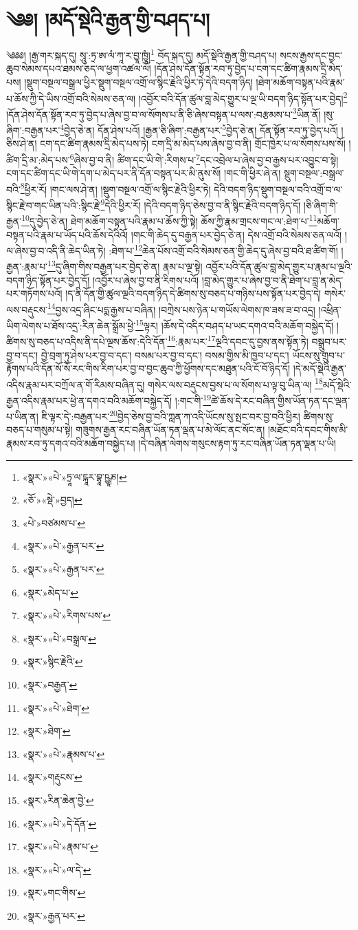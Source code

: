 \chapter{༄༅། །མདོ་སྡེའི་རྒྱན་གྱི་བཤད་པ།}༄༅༅། །རྒྱ་གར་སྐད་དུ། སཱུ་:ཏྲ་ཨ་ལཾ་ཀཱ་ར་བྱཱ་ཁྱཱཾ།\footnote{«སྣར་»«པེ་»ཏྲཱ་ལ་ངྐཱར་བྷཱ་ཥྱཱཎ།} བོད་སྐད་དུ། མདོ་སྡེའི་རྒྱན་གྱི་བཤད་པ། སངས་རྒྱས་དང་བྱང་ཆུབ་སེམས་དཔའ་ཐམས་ཅད་ལ་ཕྱག་འཚལ་ལོ། །དོན་ཤེས་དོན་སྟོན་རབ་ཏུ་བྱེད་པ་ངག་དང་ཚིག་རྣམས་དྲི་མེད་པས། །སྡུག་བསྔལ་བསྒྲལ་ཕྱིར་སྡུག་བསྔལ་འགྲོ་ལ་སྙིང་རྗེའི་ཕྱིར་ཏེ་དེའི་བདག་ཉིད། །ཐེག་མཆོག་བསྟན་པའི་རྣམ་པ་ཆོས་ཀྱི་དེ་ཡིས་འགྲོ་བའི་སེམས་ཅན་ལ། །འབྱོར་བའི་དོན་ཚུལ་བླ་མེད་གྱུར་པ་ལྔ་ཡི་བདག་ཉིད་སྟོན་པར་བྱེད།\footnote{«ཅོ་»«སྡེ་»བྱད།} །དོན་ཤེས་དོན་སྟོན་རབ་ཏུ་བྱེད་པ་ཞེས་བྱ་བ་ལ་སོགས་པ་ནི་ཅི་ཞེས་བསྟན་པ་ལས་:བརྩམས་པ་\footnote{«པེ་»བཙམས་པ་}ཡིན་ནོ། །སུ་ཞིག་:བརྒྱན་པར་\footnote{«སྣར་»«པེ་»རྒྱན་པར་}བྱེད་ཅེ་ན། དོན་ཤེས་པའོ། །རྒྱན་ཅི་ཞིག་:བརྒྱན་པར་\footnote{«སྣར་»«པེ་»རྒྱན་པར་}བྱེད་ཅེ་ན། དོན་སྟོན་རབ་ཏུ་བྱེད་པའོ། །ཅིས་ཤེ་ན། ངག་དང་ཚིག་རྣམས་དྲི་མེད་པས་ཏེ། ངག་དྲི་མ་མེད་པས་ཞེས་བྱ་བ་ནི། གྲོང་ཁྱེར་པ་ལ་སོགས་པས་སོ། །ཚིག་དྲི་མ་:མེད་པས་\footnote{«སྣར་»མེད་པ་}ཞེས་བྱ་བ་ནི། ཚིག་དང་ཡི་གེ་:རིགས་པ་\footnote{«སྣར་»«པེ་»རིགས་པས་}དང་འབྲེལ་པ་ཞེས་བྱ་བ་རྒྱས་པར་འབྱུང་བ་སྟེ། ངག་དང་ཚིག་དང་ཡི་གེ་དག་པ་མེད་པར་ནི་དོན་བསྟན་པར་མི་ནུས་སོ། །གང་གི་ཕྱིར་ཞེ་ན། སྡུག་བསྔལ་:བསྒྲལ་བའི་\footnote{«སྣར་»«པེ་»བསྒྲལ་}ཕྱིར་རོ། །གང་ལས་ཤེ་ན། །སྡུག་བསྔལ་འགྲོ་ལ་སྙིང་རྗེའི་ཕྱིར་ཏེ། དེའི་བདག་ཉིད་སྡུག་བསྔལ་བའི་འགྲོ་བ་ལ་སྙིང་རྗེ་བ་གང་ཡིན་པའི་:སྙིང་རྗེ་\footnote{«སྣར་»སྙིང་རྗེའི་}དེའི་ཕྱིར་རོ། །དེའི་བདག་ཉིད་ཅེས་བྱ་བ་ནི་སྙིང་རྗེའི་བདག་ཉིད་དོ། །ཅི་ཞིག་གི་རྒྱན་\footnote{«སྣར་»བརྒྱན་}དུ་བྱེད་ཅེ་ན། ཐེག་མཆོག་བསྟན་པའི་རྣམ་པ་ཆོས་ཀྱི་སྟེ། ཆོས་ཀྱི་རྣམ་གྲངས་གང་ལ་:ཐེག་པ་\footnote{«སྣར་»«པེ་»ཐེག་}མཆོག་བསྟན་པའི་རྣམ་པ་ཡོད་པའི་ཆོས་དེའིའོ། །གང་གི་ཆེད་དུ་བརྒྱན་པར་བྱེད་ཅེ་ན། དེས་འགྲོ་བའི་སེམས་ཅན་ལའོ། །ལ་ཞེས་བྱ་བ་འདི་ནི་ཆེད་ཡིན་ཏེ། :ཐེག་པ་\footnote{«སྣར་»ཐེག་}ཆེན་པོས་འགྲོ་བའི་སེམས་ཅན་གྱི་ཆེད་དུ་ཞེས་བྱ་བའི་ཐ་ཚིག་གོ། །རྒྱན་:རྣམ་པ་\footnote{«སྣར་»«པེ་»རྣམས་པ་}དུ་ཞིག་གིས་བརྒྱན་པར་བྱེད་ཅེ་ན། རྣམ་པ་ལྔ་སྟེ། འབྱོར་པའི་དོན་ཚུལ་བླ་མེད་གྱུར་པ་རྣམ་པ་ལྔའི་བདག་ཉིད་སྟོན་པར་བྱེད་དོ། །འབྱོར་པ་ཞེས་བྱ་བ་ནི་རིགས་པའོ། །བླ་མེད་གྱུར་པ་ཞེས་བྱ་བ་ནི་ཐེག་པ་བླ་ན་མེད་པར་གཏོགས་པའོ། །ད་ནི་དོན་གྱི་ཚུལ་ལྔའི་བདག་ཉིད་དེ་ཚིགས་སུ་བཅད་པ་གཉིས་པས་སྟོན་པར་བྱེད་དེ། གསེར་ལས་བརྡུངས་\footnote{«སྣར་»གརྡུངས་}བྱས་འདྲ་ཞིང་པདྨ་རྒྱས་པ་བཞིན། །བཀྲེས་པས་ཉེན་པ་གཡོས་ལེགས་ཁ་ཟས་ཟ་བ་འདྲ། །འཕྲིན་ཡིག་ལེགས་པ་ཐོས་འདྲ་:རིན་ཆེན་སྒྲོམ་ཕྱེ་\footnote{«སྣར་»རིན་ཆེན་བྱེ་}ལྟར། །ཆོས་དེ་འདིར་བཤད་པ་ཡང་དགའ་བའི་མཆོག་བསྐྱེད་དོ། །ཚིགས་སུ་བཅད་པ་འདིས་ནི་དཔེ་ལྔས་ཆོས་:དེའི་དོན་\footnote{«སྣར་»«པེ་»དེ་དོན་}:རྣམ་པར་\footnote{«སྣར་»«པེ་»རྣམ་པ་}ལྔའི་དབང་དུ་བྱས་ནས་སྟོན་ཏེ། བསྒྲུབ་པར་བྱ་བ་དང་། བྱེ་བྲག་ཏུ་ཤེས་པར་བྱ་བ་དང་། བསམ་པར་བྱ་བ་དང་། བསམ་གྱིས་མི་ཁྱབ་པ་དང་། ཡོངས་སུ་གྲུབ་པ་རྟོགས་པའི་དོན་སོ་སོ་རང་གིས་རིག་པར་བྱ་བ་བྱང་ཆུབ་ཀྱི་ཕྱོགས་དང་མཐུན་པའི་ངོ་བོ་ཉིད་དོ། །དེ་མདོ་སྡེའི་རྒྱན་འདིས་རྣམ་པར་བཀྲོལ་ན་གོ་རིམས་བཞིན་དུ། གསེར་ལས་བརྡུངས་བྱས་པ་ལ་སོགས་པ་ལྟ་བུ་ཡིན་ལ། \footnote{«སྣར་»«པེ་»ལ་དེ་}མདོ་སྡེའི་རྒྱན་འདིས་རྣམ་པར་ཕྱེ་ན་དགའ་བའི་མཆོག་བསྐྱེད་དོ། །:གང་གི་\footnote{«སྣར་»གང་གིས་}ཚེ་ཆོས་དེ་རང་བཞིན་གྱིས་ཡོན་ཏན་དང་ལྡན་པ་ཡིན་ན། ཇི་ལྟར་དེ་:བརྒྱན་པར་\footnote{«སྣར་»རྒྱན་པར་}བྱེད་ཅེས་བྱ་བའི་ཀླན་ཀ་འདི་ཡོངས་སུ་སྤང་བར་བྱ་བའི་ཕྱིར། ཚིགས་སུ་བཅད་པ་གསུམ་པ་སྟེ། གཟུགས་རྒྱན་རང་བཞིན་ཡོན་ཏན་ལྡན་པ་མེ་ལོང་ནང་སོང་ན། །མཐོང་བའི་དབང་གིས་མི་རྣམས་རབ་ཏུ་དགའ་བའི་མཆོག་བསྐྱེད་པ། །དེ་བཞིན་ལེགས་གསུངས་རྟག་ཏུ་རང་བཞིན་ཡོན་ཏན་ལྡན་པ་ཡི། 